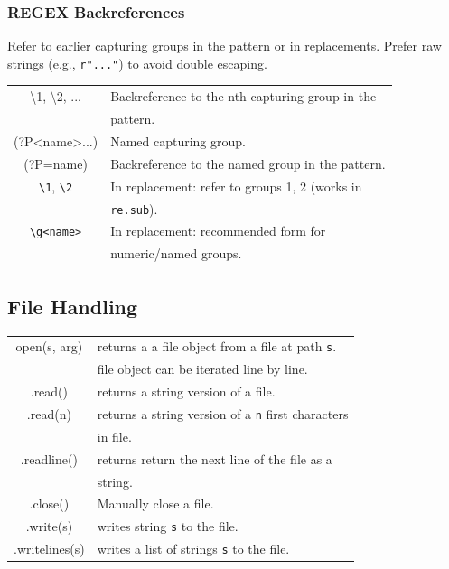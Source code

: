 \documentclass[5pt]{article}
\begin{document}
\begin{multicols}{2}
\subsubsection{REGEX Backreferences}
Refer to earlier capturing groups in the pattern or in replacements. Prefer raw strings (e.g., \texttt{r"..."}) to avoid double escaping.
\begin{tabular}{C L}
\textbackslash 1, \textbackslash 2, ...                 & Backreference to the nth capturing group in the\\
                                                        & pattern.\\
(?P<name>...)                                           & Named capturing group.\\
(?P=name)                                               & Backreference to the named group in the pattern.\\
\texttt{\textbackslash 1}, \texttt{\textbackslash 2}    & In replacement: refer to groups 1, 2 (works in\\
                                                        & \texttt{re.sub}).\\
\texttt{\textbackslash g<name>}                         & In replacement: recommended form for\\
                                                        & numeric/named groups.\\
\end{tabular}

\subsection{File Handling}
\begin{tabular}{C L}
    open(s, arg)    & returns a a file object from a file at path \texttt{s}.\\
                    & file object can be iterated line by line.\\
    .read()         & returns a string version of a file.\\
    .read(n)        & returns a string version of a \texttt{n} first characters\\
                    & in file.\\
    .readline()     & returns return the next line of the file as a\\
                    & string.\\
    .close()        & Manually close a file.\\
    .write(s)       & writes string \texttt{s} to the file.\\
    .writelines(s)  & writes a list of strings \texttt{s} to the file.\\
\end{tabular}


\end{multicols}
\end{document}
